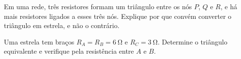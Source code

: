 \begin{questao}[2]{}

Em uma rede, três resistores formam um triângulo entre os nós $P$, $Q$ e $R$,
e há mais resistores ligados a esses três nós. Explique por que convém
converter o triângulo em estrela, e não o contrário.


\end{questao}
\begin{questao}[2]{}

Uma estrela tem braços $R_A=R_B=\SI{6}{\ohm}$ e $R_C=\SI{3}{\ohm}$. Determine o
triângulo equivalente e verifique pela resistência entre $A$ e $B$.


\end{questao}

